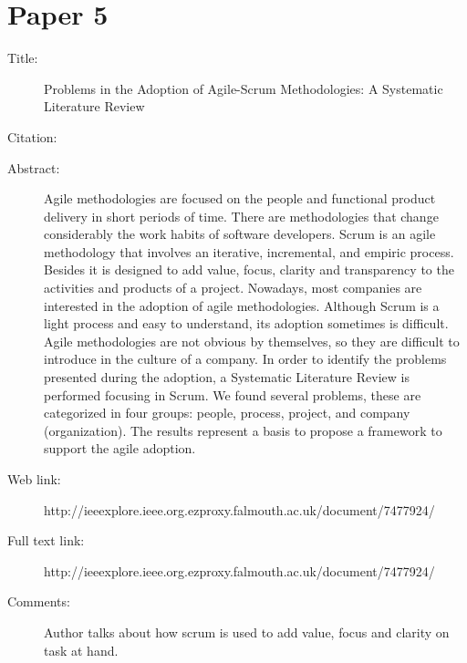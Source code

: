 \documentclass{scrartcl}
\begin{document}
\section*{Paper 5}
\begin{description}
\item[Title:] Problems in the Adoption of Agile-Scrum Methodologies: A Systematic Literature Review
\item[Citation:] \cite{7477924}
\item[Abstract:] Agile methodologies are focused on the people and functional product delivery in short periods of time. There are methodologies that change considerably the work habits of software developers. Scrum is an agile methodology that involves an iterative, incremental, and empiric process. Besides it is designed to add value, focus, clarity and transparency to the activities and products of a project. Nowadays, most companies are interested in the adoption of agile methodologies. Although Scrum is a light process and easy to understand, its adoption sometimes is difficult. Agile methodologies are not obvious by themselves, so they are difficult to introduce in the culture of a company. In order to identify the problems presented during the adoption, a Systematic Literature Review is performed focusing in Scrum. We found several problems, these are categorized in four groups: people, process, project, and company (organization). The results represent a basis to propose a framework to support the agile adoption.
\item[Web link:] http://ieeexplore.ieee.org.ezproxy.falmouth.ac.uk/document/7477924/
\item[Full text link:] http://ieeexplore.ieee.org.ezproxy.falmouth.ac.uk/document/7477924/
\item[Comments:] Author talks about how scrum is used to add value, focus and clarity on task at hand.
\end{description}



\end{document}
